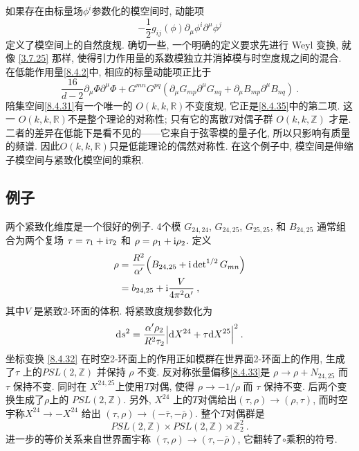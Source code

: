 如果存在由标量场$\phi^{i}$参数化的模空间时, 动能项
\begin{equation}
	-\frac{1}{2} g_{i j}(\phi) \partial_{\mu} \phi^{i} \partial^{\mu} \phi^{j} \label{8.4.34}
\end{equation}
定义了模空间上的自然度规. 确切一些, 一个明确的定义要求先进行 Weyl 变换, 就像 \eqref{3.7.25} 那样, 使得引力作用量的系数模独立并消掉模与时空度规之间的混合. 
在低能作用量\eqref{8.4.2}中, 相应的标量动能项正比于
\begin{equation}
	\frac{16}{d-2} \partial_{\mu} \Phi \partial^{\mu} \Phi+G^{m n} G^{p q}
	(\partial_{\mu} G_{m p} \partial^{\mu} G_{n q}+\partial_{\mu} B_{m p} \partial^{\mu} B_{n q}) \:. \label{8.4.35}
\end{equation}
陪集空间\eqref{8.4.31}有一个唯一的 $O(k, k, \mathds{R})$不变度规, 它正是\eqref{8.4.35}中的第二项. 
这一 $O(k, k, \mathds{R})$不是整个理论的对称性; 只有它的离散$T$对偶子群 $O(k, k, \mathds{Z})$ 才是. 
二者的差异在低能下是看不见的——它来自于弦零模的量子化, 所以只影响有质量的频谱. 因此$O(k, k, \mathds{R})$只是低能理论的偶然对称性. 
在这个例子中, 模空间是伸缩子模空间与紧致化模空间的乘积.

\subsection*{例子}
两个紧致化维度是一个很好的例子. 4个模 $G_{24,24}$, $G_{24,25}$, $G_{25,25}$, 和 $B_{24,25}$ 通常组合为两个复场 $\tau=\tau_{1}+\mathrm{i} \tau_{2}$ 和 $\rho=\rho_{1}+\mathrm{i} \rho_{2}$. 定义
\begin{align}
	\rho &= \frac{R^{2}}{\alpha^{\prime}}\Bigl(B_{24,25} + \mathrm{i} \operatorname{det}^{1 / 2} G_{m n}\Bigr) \nonumber \\
		 &= b_{24,25}+\mathrm{i} \frac{V}{4 \pi^{2} \alpha^{\prime}} \:, \label{8.4.36}
\end{align}
其中$V$ 是紧致2-环面的体积. 将紧致度规参数化为
\begin{equation}
	\mathrm{d} s^{2}=\frac{\alpha^{\prime} \rho_{2}}{R^{2} \tau_{2}}\Bigl|\mathrm{d} X^{24}+\tau \mathrm{d} X^{25}\Bigr|^{2} \:. \label{8.4.37}
\end{equation}
坐标变换 \eqref{8.4.32} 在时空2-环面上的作用正如模群在世界面2-环面上的作用, 生成了$\tau$ 上的$P S L(2, \mathds{Z})$ 并保持 $\rho$ 不变. 
反对称张量偏移\eqref{8.4.33}是 $\rho \rightarrow \rho+N_{24,25}$ 而 $\tau$ 保持不变. 
同时在 $X^{24,25}$上使用$T$对偶, 使得 $\rho \rightarrow-1 / \rho$ 而 $\tau$ 保持不变. 
后两个变换生成了$\rho$上的 $P S L(2, \mathds{Z})$. 另外,  $X^{24}$ 上的$T$对偶给出$(\tau, \rho) \rightarrow(\rho, \tau)$, 
而时空宇称$X^{24} \rightarrow-X^{24}$ 给出 $(\tau, \rho) \rightarrow(-\bar{\tau},-\bar{\rho})$. 整个$T$对偶群是
\begin{equation}
	P S L(2, \mathds{Z}) \times P S L(2, \mathds{Z}) \rtimes \mathds{Z}_{2}^{2} \:. \label{8.4.38}
\end{equation}
进一步的等价关系来自世界面宇称 $(\tau, \rho) \rightarrow(\tau,-\bar{\rho}) $, 它翻转了$\vysmwhtcircle$乘积的符号. 

